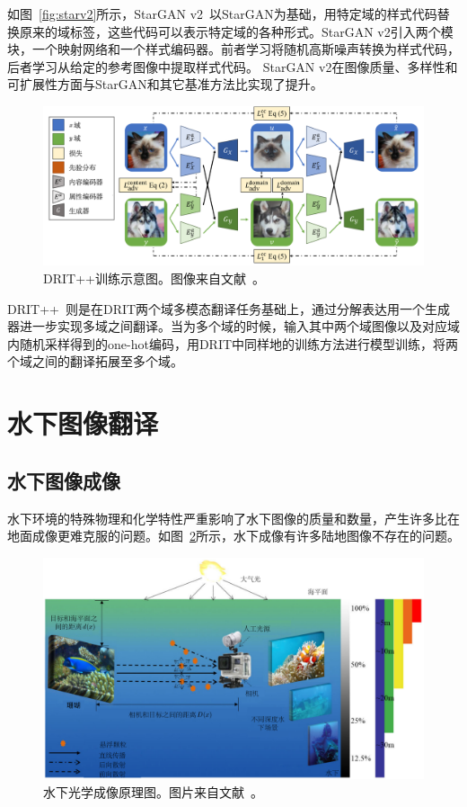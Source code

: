 如图~\ref{fig:starv2}所示，StarGAN v2~\cite{choi2020stargan}以StarGAN为基础，用特定域的样式代码替换原来的域标签，这些代码可以表示特定域的各种形式。StarGAN v2引入两个模块，一个映射网络和一个样式编码器。前者学习将随机高斯噪声转换为样式代码，后者学习从给定的参考图像中提取样式代码。
StarGAN v2在图像质量、多样性和可扩展性方面与StarGAN和其它基准方法比实现了提升。

\begin{figure}[ht]
    \centering
	\includegraphics[width=\textwidth]{figures/DRIT++.png}
	\caption{DRIT++训练示意图。图像来自文献~\cite{lee2020drit++}。}
	\label{fig:drit++}
\end{figure}

DRIT++~\cite{lee2020drit++}则是在DRIT两个域多模态翻译任务基础上，通过分解表达用一个生成器进一步实现多域之间翻译。当为多个域的时候，输入其中两个域图像以及对应域内随机采样得到的one-hot编码，用DRIT中同样地的训练方法进行模型训练，将两个域之间的翻译拓展至多个域。

\section{水下图像翻译}
\subsection{水下图像成像}
水下环境的特殊物理和化学特性严重影响了水下图像的质量和数量，产生许多比在地面成像更难克服的问题。如图~\ref{fig:underwater}所示，水下成像有许多陆地图像不存在的问题。

\begin{figure}[ht]
    \centering
	\includegraphics[width=\textwidth]{figures/水下成像.pdf}
	\caption{水下光学成像原理图。图片来自文献~\cite{2002Vision}。}
	\label{fig:underwater}
\end{figure}

